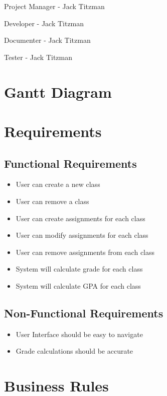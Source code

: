 \documentclass[12pt]{article}
\begin{document}
Project Manager - Jack Titzman

Developer - Jack Titzman

Documenter - Jack Titzman

Tester - Jack Titzman

\newpage

\section*{Gantt Diagram}


\newpage

\section*{Requirements}

\subsection*{Functional Requirements}

\begin{itemize}
	\item User can create a new class
	\item User can remove a class
	\item User can create assignments for each class
	\item User can modify assignments for each class
	\item User can remove assignments from each class
	\item System will calculate grade for each class
	\item System will calculate GPA for each class
\end{itemize}

\subsection*{Non-Functional Requirements}

\begin{itemize}
	\item User Interface should be easy to navigate
	\item Grade calculations should be accurate
\end{itemize}

\newpage

\section*{Business Rules}
\end{document}
